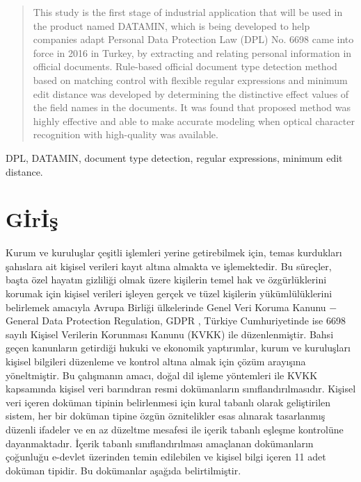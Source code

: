 \documentclass[conference, a4paper]{IEEEtran}
\begin{document}
\begin{abstract}
    This study is the first stage of industrial application that will be used in the product named DATAMIN, which is
    being developed to help companies adapt Personal Data Protection Law (DPL) No. 6698 came into force in 2016 in
    Turkey, by extracting and relating personal information in official documents. Rule-based official document type
    detection method based on matching control with flexible regular expressions and minimum edit distance was
    developed by determining the distinctive effect values of the field names in the documents. It was found that
    proposed method was highly effective and able to make accurate modeling when optical character recognition with
    high-quality was available.
\end{abstract}

\begin{IEEEkeywords}
    DPL, DATAMIN, document type detection, regular expressions, minimum edit distance.
\end{IEEEkeywords}

\IEEEpeerreviewmaketitle

\IEEEpubidadjcol

\section{G{\footnotesize İ}r{\footnotesize İ}ş}
\label{sect:giris}
Kurum ve kuruluşlar çeşitli işlemleri yerine getirebilmek için, temas kurdukları şahıslara ait kişisel verileri kayıt
altına almakta ve işlemektedir. Bu süreçler, başta özel hayatın gizliliği olmak üzere kişilerin temel hak ve
özgürlüklerini korumak için kişisel verileri işleyen gerçek ve tüzel kişilerin yükümlülüklerini belirlemek amacıyla
Avrupa Birliği ülkelerinde Genel Veri Koruma Kanunu $-$General Data Protection Regulation, GDPR
\cite{otto2018regulation}, Türkiye Cumhuriyetinde ise 6698 sayılı Kişisel Verilerin Korunması Kanunu (KVKK) ile
\cite{turkiye2016title} düzenlenmiştir. Bahsi geçen kanunların getirdiği hukuki ve ekonomik yaptırımlar, kurum ve
kuruluşları kişisel bilgileri düzenleme ve kontrol altına almak için çözüm arayışına yöneltmiştir. Bu çalışmanın amacı,
doğal dil işleme yöntemleri ile KVKK kapsamında kişisel veri barındıran resmi dokümanların sınıflandırılmasıdır.
Kişisel veri içeren doküman tipinin belirlenmesi için kural tabanlı olarak geliştirilen sistem, her bir doküman tipine
özgün öznitelikler esas alınarak tasarlanmış düzenli ifadeler ve en az düzeltme mesafesi ile içerik tabanlı eşleşme
kontrolüne dayanmaktadır. İçerik tabanlı sınıflandırılması amaçlanan dokümanların çoğunluğu e-devlet üzerinden temin
edilebilen ve kişisel bilgi içeren 11 adet doküman tipidir. Bu dokümanlar aşağıda belirtilmiştir.
\end{document}
